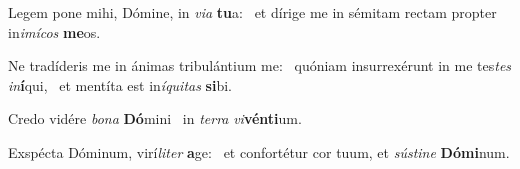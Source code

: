 \item Legem pone mihi, Dómine, in \textit{via} \textbf{tu}a:~\psstar{} et dírige me in sémitam rectam propter in\textit{imícos} \textbf{me}os.
\item Ne tradíderis me in ánimas tribulántium me:~\pscross{} quóniam insurrexérunt in me tes\textit{tes} \textit{in}\textbf{í}qui,~\psstar{} et mentíta est in\textit{íquitas} \textbf{si}bi.
\item Credo vidére \textit{bona} \textbf{Dó}mini~\psstar{} in \textit{terra} \textit{vi}\textbf{vén}\textbf{ti}um.
\item Exspécta Dóminum, virí\textit{liter} \textbf{a}ge:~\psstar{} et confortétur cor tuum, et \textit{sústine} \textbf{Dó}\textbf{mi}num.
